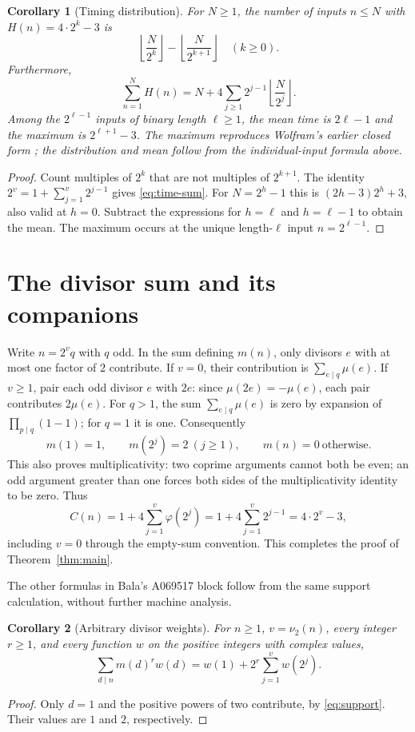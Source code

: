 \documentclass[11pt]{article}
\newtheorem{corollary}{Corollary}
\newcommand{\val}{\nu_2}
\begin{document}
\begin{corollary}[Timing distribution]\label{cor:timing}
For $N\geq1$, the number of inputs $n\leq N$ with
$H(n)=4\cdot2^k-3$ is
\[
 \left\lfloor\frac{N}{2^k}\right\rfloor-
 \left\lfloor\frac{N}{2^{k+1}}\right\rfloor\quad(k\geq0).
\]
Furthermore,
\begin{equation}\label{eq:time-sum}
 \sum_{n=1}^N H(n)=N+4\sum_{j\geq1}2^{j-1}
                    \left\lfloor\frac{N}{2^j}\right\rfloor .
\end{equation}
Among the $2^{\ell-1}$ inputs of binary length $\ell\geq1$, the mean
time is $2\ell-1$ and the maximum is $2^{\ell+1}-3$.
The maximum reproduces Wolfram's earlier closed form \cite{wolfram}; the
distribution and mean follow from the individual-input formula above.
\end{corollary}
\begin{proof}
Count multiples of $2^k$ that are not multiples of $2^{k+1}$.
The identity $2^v=1+\sum_{j=1}^v2^{j-1}$ gives
\eqref{eq:time-sum}. For $N=2^h-1$ this is
$(2h-3)2^h+3$, also valid at $h=0$. Subtract the expressions for
$h=\ell$ and $h=\ell-1$ to obtain the mean. The maximum occurs at the
unique length-$\ell$ input $n=2^{\ell-1}$.
\end{proof}

\section{The divisor sum and its companions}
Write $n=2^vq$ with $q$ odd. In the sum defining $m(n)$, only divisors
$e$ with at most one factor of $2$ contribute. If $v=0$, their contribution
is $\sum_{e\mid q}\mu(e)$. If $v\geq1$, pair each odd divisor $e$ with
$2e$: since $\mu(2e)=-\mu(e)$, each pair contributes $2\mu(e)$.
For $q>1$, the sum $\sum_{e\mid q}\mu(e)$ is zero by expansion of
$\prod_{p\mid q}(1-1)$; for $q=1$ it is one. Consequently
\begin{equation}\label{eq:support}
m(1)=1,\qquad m(2^j)=2\ (j\geq1),\qquad m(n)=0
\ \text{otherwise}.
\end{equation}
This also proves multiplicativity: two coprime arguments cannot both be
even; an odd argument greater than one forces both sides of the
multiplicativity identity to be zero. Thus
\[
C(n)=1+4\sum_{j=1}^{v}\varphi(2^j)
=1+4\sum_{j=1}^{v}2^{j-1}
=4\cdot2^v-3,
\]
including $v=0$ through the empty-sum convention. This completes the proof
of Theorem~\ref{thm:main}.

The other formulas in Bala's A069517 block follow from the same support
calculation, without further machine analysis.
\begin{corollary}[Arbitrary divisor weights]\label{cor:weights}
For $n\geq1$, $v=\val(n)$, every integer $r\geq1$, and every function
$w$ on the positive integers with complex values,
\begin{equation}\label{eq:weights}
 \sum_{d\mid n}m(d)^r w(d)=w(1)+2^r\sum_{j=1}^v w(2^j).
\end{equation}
\end{corollary}
\begin{proof}
Only $d=1$ and the positive powers of two contribute, by
\eqref{eq:support}. Their values are $1$ and $2$, respectively.
\end{proof}
\end{document}
